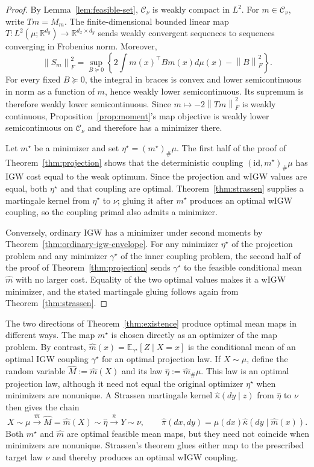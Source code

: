 \documentclass[11pt]{article}
\newcommand{\R}{\mathbb R}
\newcommand{\E}{\mathbb E}
\newcommand{\norm}[1]{\left\lVert #1\right\rVert}
\theoremstyle{plain}
\theoremstyle{definition}
\theoremstyle{remark}
\begin{document}
\begin{proof}
By Lemma~\ref{lem:feasible-set}, $\mathcal C_\nu$ is weakly compact in $L^2$.
For $m\in\mathcal C_\nu$, write $Tm=M_m$. The finite-dimensional bounded linear
map $T:L^2(\mu;\R^{d_y})\to\R^{d_x\times d_y}$ sends weakly convergent sequences
to sequences converging in Frobenius norm. Moreover,
\[
 \norm{S_m}_F^2
 =\sup_{B\succeq0}\left\{2\int m(x)^\top Bm(x)d\mu(x)-\norm B_F^2\right\}.
\]
For every fixed $B\succeq0$, the integral in braces is convex and
lower semicontinuous in norm as a function of $m$, hence weakly lower semicontinuous.
Its supremum is therefore
weakly lower semicontinuous. Since $m\mapsto-2\norm{Tm}_F^2$ is weakly continuous,
Proposition~\ref{prop:moment}'s map objective is weakly lower semicontinuous on
$\mathcal C_\nu$ and therefore has a minimizer there.

Let $m^\star$ be a minimizer and set $\eta^\star=(m^\star)_\#\mu$. The first half
of the proof of Theorem~\ref{thm:projection} shows that the deterministic coupling
$(\mathrm{id},m^\star)_\#\mu$ has IGW cost equal to the weak optimum. Since the
projection and wIGW values are equal, both $\eta^\star$ and that coupling are
optimal. Theorem~\ref{thm:strassen} supplies a martingale kernel from
$\eta^\star$ to $\nu$; gluing it after $m^\star$ produces an optimal wIGW coupling,
so the coupling primal also admits a minimizer.

Conversely, ordinary IGW has a minimizer under second moments by
Theorem~\ref{thm:ordinary-igw-envelope}. For any minimizer $\eta^\star$ of the
projection problem and any minimizer $\gamma^\star$ of the inner coupling problem,
the second half of the proof
of Theorem~\ref{thm:projection} sends $\gamma^\star$ to the feasible conditional
mean $\widehat m$ with no larger cost. Equality of the two optimal values makes it a
wIGW minimizer, and the stated martingale gluing follows again from
Theorem~\ref{thm:strassen}.
\end{proof}

The two directions of Theorem~\ref{thm:existence} produce optimal mean maps in
different ways. The map $m^\star$ is chosen directly as an optimizer of the map
problem. By contrast, $\widehat m(x)=\E_{\gamma^\star}[Z\mid X=x]$ is the
conditional mean of an optimal IGW coupling $\gamma^\star$ for an optimal
projection law. If $X\sim\mu$, define the random variable
$\widehat M:=\widehat m(X)$ and its law
$\widehat\eta:=\widehat m_\#\mu$. This law is an optimal projection law, although
it need not equal the original optimizer $\eta^\star$ when minimizers are
nonunique. A Strassen martingale kernel
$\widehat\kappa(dy\mid z)$ from $\widehat\eta$ to $\nu$ then gives the chain
\[
 X\sim\mu
 \xrightarrow{\ \widehat m\ }
 \widehat M=\widehat m(X)\sim\widehat\eta
 \xrightarrow{\ \widehat\kappa\ }
 Y\sim\nu,
 \qquad
 \widehat\pi(dx,dy)
 =\mu(dx)\widehat\kappa(dy\mid\widehat m(x)).
\]
Both $m^\star$ and $\widehat m$ are optimal feasible mean maps, but they need not
coincide when minimizers are nonunique. Strassen's theorem glues either map to the
prescribed target law $\nu$ and thereby produces an optimal wIGW coupling.
\end{document}
